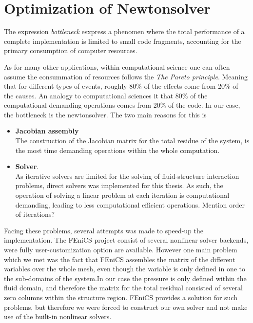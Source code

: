 \newpage
\section{Optimization of Newtonsolver}
The expression \textit{bottleneck} esxpress a phenomen where the total performance of a complete implementation is limited to small code fragments, accounting for the primary consumption of computer resources.

As for many other applications, within computational science one can often assume the consummation of resources follows the \textit{The Pareto principle}. Meaning that for different types of events, roughly 80\% of the effects come from 20\% of the causes. An analogy to computational sciences it that 80\% of the computational demanding operations comes from 20\% of the code. In our case, the bottleneck is the newtonsolver. The two main reasons for this is 

\begin{itemize}
\item \textbf{Jacobian assembly} \\
The construction of the Jacobian matrix for the total residue of the system, is the most time demanding operations within the whole computation. 
\item \textbf{Solver}. \\ 
As iterative solvers are limited for the solving of fluid-structure interaction problems, direct solvers was implemented for this thesis. As such, the operation of solving a linear problem at each iteration is computational demanding, leading to  less computational efficient operations. Mention order of iterations?
\end{itemize}

Facing these problems, several attempts was made to speed-up the implementation. The FEniCS project consist of several nonlinear solver backends, were fully user-customization option are available. However one main problem which we met was the fact that FEniCS assembles the matrix of the different variables over the whole mesh, even though the variable is only defined in one to the sub-domains of the system.In our case the pressure is only defined within the fluid domain, and therefore the matrix for the total residual consisted of several zero columns within the structure region. FEniCS provides a solution for such problems, but therefore we were forced to construct our own solver and not make use of the built-in nonlinear solvers. \\

